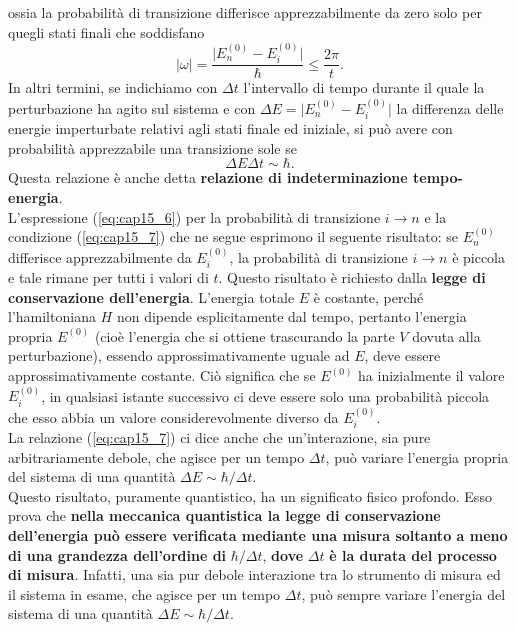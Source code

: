 \documentclass[a4paper,12pt,oneside]{book}
\begin{document}
ossia la probabilità di transizione differisce apprezzabilmente da zero solo per quegli stati finali che soddisfano
\begin{equation}
\vert \omega \vert = \frac{\vert E_n ^{(0)} - E_i ^{(0)}\vert}{\hbar} \leq \frac{2\pi}{t}.
\end{equation}
In altri termini, se indichiamo con $\Delta t$ l'intervallo di tempo durante il quale la perturbazione ha agito sul sistema e con $\Delta E = \vert E_n ^{(0)} - E_i ^{(0)}\vert$ la differenza delle energie imperturbate relativi agli stati finale ed iniziale, si può avere con probabilità apprezzabile una transizione sole se
\begin{equation}
\Delta E \Delta t \sim \hbar .
\label{eq:cap15_7}
\end{equation}
Questa relazione è anche detta \textbf{relazione di indeterminazione tempo-energia}.\\
L'espressione (\ref{eq:cap15_6}) per la probabilità di transizione $i\rightarrow n$ e la condizione (\ref{eq:cap15_7}) che ne segue esprimono il seguente risultato: se $E_n ^{(0)}$ differisce apprezzabilmente da   $E_i ^{(0)}$, la probabilità di transizione $i \rightarrow n$ è piccola e tale rimane per tutti i valori di $t$. Questo risultato è richiesto dalla  \textbf{legge di conservazione dell'energia}. L'energia totale $E$ è costante, perché l'hamiltoniana $H$ non dipende esplicitamente dal tempo, pertanto l'energia propria $E^{(0)}$ (cioè l'energia che si ottiene trascurando la parte $V$ dovuta alla perturbazione), essendo approssimativamente uguale ad $E$, deve essere approssimativamente costante. Ciò significa che se $E^{(0)}$ ha inizialmente il valore $E _i ^{(0)}$, in qualsiasi istante successivo ci deve essere solo una probabilità piccola che esso abbia un valore considerevolmente diverso da $E _i ^{(0)}$.\\
La relazione (\ref{eq:cap15_7}) ci dice anche che un'interazione, sia pure arbitrariamente debole, che agisce per un tempo $\Delta t$, può variare l'energia propria del sistema di una quantità $\Delta E \sim \hbar /\Delta t$.\\
Questo risultato, puramente quantistico, ha un significato fisico profondo. Esso prova che \textbf{nella meccanica quantistica la legge di conservazione dell'energia può essere verificata mediante una misura soltanto a meno di una grandezza dell'ordine di} $\hbar /\Delta t$, \textbf{dove } $\Delta t$ \textbf{è la durata del processo di misura}. Infatti, una sia pur debole interazione tra lo strumento di misura ed il sistema in esame, che agisce per un tempo $\Delta t $, può sempre variare l'energia del sistema di una quantità $\Delta E \sim \hbar /\Delta t$.\\
\end{document}
